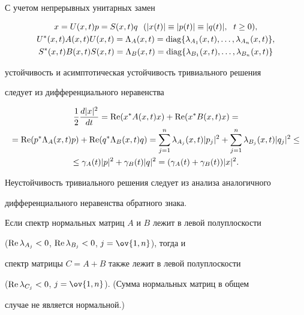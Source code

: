 \begin{pf}


С учетом непрерывных унитарных замен


\begin{gather*}


x=U(x,t)p=S(x,t)q\ \ (|x(t)|\equiv|p(t)|\equiv|q(t)|,\ \; t\ge0),\\


U^*(x,t)A(x,t)U(x,t)=\Lambda_A(x,t)=


\diag\{\lambda_{A_1}(x,t),\dotsc,\lambda_{A_n}(x,t)\},\\


S^*(x,t)B(x,t)S(x,t)=\Lambda_B(x,t)=


\diag\{\lambda_{B_1}(x,t),\dotsc,\lambda_{B_n}(x,t)\}


\end{gather*}


устойчивость и асимптотическая устойчивость тривиального решения 


следует из дифференциального неравенства


\begin{multline*}


\frac{1}{2}\frac{d|x|^2}{d t}=\re(x^*A(x,t)x)+


\re(x^*B(x,t)x)= \\


%


=\re(p^*\Lambda_A(x,t)p)+\re(q^*\Lambda_B(x,t)q)=


\sum^n_{j=1} \lambda_{A_j}(x,t)|p_j|^2+


\sum^n_{j=1} \lambda_{B_j}(x,t)|q_j|^2\le \\


%


\le \gamma_A(t)|p|^2+\gamma_B(t)|q|^2=


(\gamma_A(t)+\gamma_B(t))|x|^2.


\end{multline*}


Неустойчивость тривиального решения следует из анализа аналогичного 


дифференциального неравенства обратного знака.


\end{pf}





\begin{cor}


Если спектр нормальных матриц $A$ и $B$ лежит в левой полуплоскости\linebreak 


($\operatorname{Re}\lambda_{A_j}<0$, $\operatorname{Re}\lambda_{B_j}<0$, $j=\ov{1,n}$), тогда и 


спектр матрицы $C=A+B$ также лежит в левой полуплоскости 


($\operatorname{Re}\lambda_{C_j}<0$, $j=\ov{1,n}$). (Сумма нормальных матриц в общем 


случае не является нормальной.)


\end{cor}





